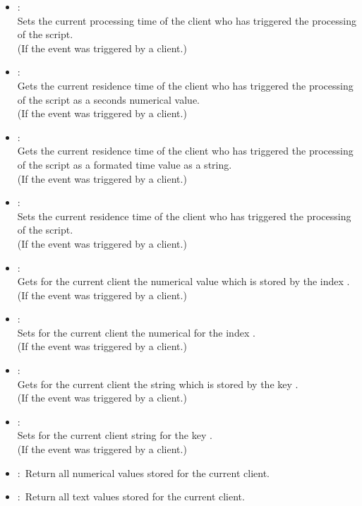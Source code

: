 \begin{itemize}
\item
{}:\\
Sets the current processing time of the client who has triggered the processing of the script.\\
(If the event was triggered by a client.)

\item
{}:\\
Gets the current residence time of the client who has triggered the processing of the script as a seconds numerical value.\\
(If the event was triggered by a client.)

\item
{}:\\
Gets the current residence time of the client who has triggered the processing of the script as a formated time value as a string.\\
(If the event was triggered by a client.)

\item
{}:\\
Sets the current residence time of the client who has triggered the processing of the script.\\
(If the event was triggered by a client.)

\item
{}:\\
Gets for the current client the numerical value which is stored by the index .\\
(If the event was triggered by a client.)
  
\item
{}:\\
Sets for the current client the numerical  for the index .\\
(If the event was triggered by a client.)

\item
{}:\\
Gets for the current client the string which is stored by the key .\\
(If the event was triggered by a client.)
  
\item
{}:\\
Sets for the current client string  for the key .\\
(If the event was triggered by a client.)

\item
{}:\
Return all numerical values stored for the current client.
  
\item
{}:\
Return all text values stored for the current client.

\end{itemize}

